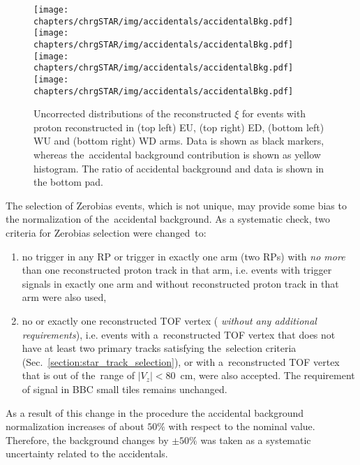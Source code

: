 \begin{figure}[h!]
	\centering
	\texttt{[image: chapters/chrgSTAR/img/accidentals/accidentalBkg.pdf]}
	\texttt{[image: chapters/chrgSTAR/img/accidentals/accidentalBkg.pdf]}
	\texttt{[image: chapters/chrgSTAR/img/accidentals/accidentalBkg.pdf]}
	\texttt{[image: chapters/chrgSTAR/img/accidentals/accidentalBkg.pdf]}
	\caption{Uncorrected distributions of the reconstructed $\xi$ for events with proton reconstructed in  (top left) EU, (top right) ED, (bottom left) WU and (bottom right) WD arms. Data is shown as black markers, whereas the~accidental background contribution is shown as yellow histogram.  The ratio of accidental background and data is shown in the bottom pad.}
	\label{fig:STARaccidentalsXi}
\end{figure}

The selection of Zerobias events, which is not unique, may provide some bias to the normalization of the~accidental background. As a systematic check, two criteria for  Zerobias selection were changed~to:
 \begin{enumerate}
 	\item no trigger in any RP or trigger in exactly one arm (two RPs) with \textit{no more} than one reconstructed proton track in that arm, i.e. events with trigger signals in exactly one arm and without reconstructed proton track in that arm were also used,
 	\item no  or exactly one reconstructed TOF vertex (%
 	\textit{without any additional requirements}), i.e. events with a~reconstructed TOF vertex that does not have at least two primary tracks satisfying the~selection criteria (Sec.~\ref{section:star_track_selection}), or with a~reconstructed TOF vertex that is out of the~range of $|V_z|<80$~cm, were also accepted. The requirement of signal in BBC small tiles remains unchanged. 
 \end{enumerate}
 As a result of this change in the procedure%
 the accidental background normalization increases of about $50\%$ with respect to the nominal value. Therefore, the background changes by $\pm50\%$ was taken as a systematic uncertainty related to the accidentals.
 
